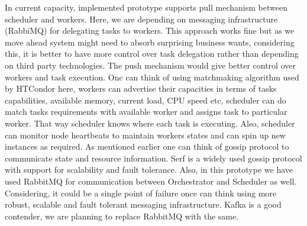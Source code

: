 \documentclass[sigconf]{acmart}
\begin{document}
In current capacity, implemented prototype supports pull mechanism between scheduler and workers. Here, we are depending on messaging infrastructure (RabbiMQ) for delegating tasks to workers. This approach works fine but as we move ahead system might need to absorb surprising business wants, considering this, it is better to have more control over task delegation rather than depending on third party technologies. The push mechanism would give better control over workers and task execution. Onc can think of using matchmaking algorithm used by HTCondor here, workers can advertise their capacities in terms of tasks capabilities, available memory, current load, CPU speed etc, scheduler can do match tasks requirements with available worker and assigns task to particular worker. That way scheduler knows where each task is executing. Also, scheduler can monitor node heartbeats to maintain workers states and can spin up new instances as required. As mentioned earlier one can think of gossip protocol to communicate state and resource information. Serf is a widely used gossip protocol with support for scalability and fault tolerance. 
Also, in this prototype we have used RabbitMQ \cite{rabbitmq} for communication between Orchestrator and Scheduler as well. Considering, it could be a single point of failure once can think using more robust, scalable and fault tolerant messaging infrastructure. Kafka is a good contender, we are planning to replace RabbitMQ with the same.    

%
%


 
\end{document}
